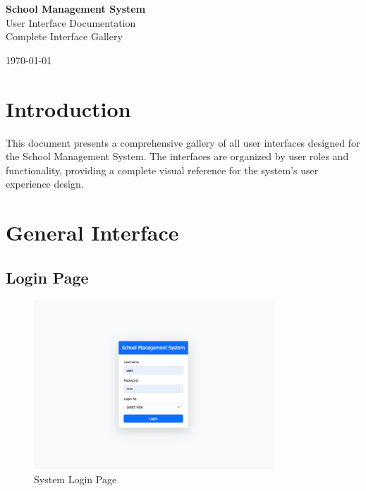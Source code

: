 \documentclass[12pt,a4paper]{article}
\begin{document}
\begin{titlepage}
    \centering
    \vspace*{2cm}
    
    {\Huge\bfseries School Management System}\\[0.5cm]
    {\Large User Interface Documentation}\\[1.5cm]
    
    {\large Complete Interface Gallery}\\[3cm]
    
    \vfill
    
    {\large \today}
\end{titlepage}

\tableofcontents
\newpage

\section{Introduction}

This document presents a comprehensive gallery of all user interfaces designed for the School Management System. The interfaces are organized by user roles and functionality, providing a complete visual reference for the system's user experience design.

\section{General Interface}

\subsection{Login Page}
\begin{figure}[H]
    \centering
    \includegraphics[width=0.8\textwidth]{login-page.png}
    \caption{System Login Page}
    \label{fig:login-page}
\end{figure}
\end{document}
